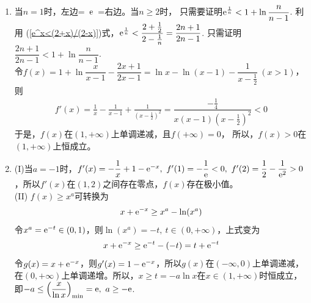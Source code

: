 \begin{enumerate}[label={\textbf{\arabic*.}},leftmargin=
    \inteval{\myenumleftmargin}pt]
\item  当$ n=1 $时，左边=\ $ \mathrm{e} $\ =右边。当$ n\geq 2 $时，
只需要证明$ \mathrm{e}^{\frac{1}{n}}<1+\ln \dfrac{n}{n-1} $. 利用
(\ref{e^x<(2+x)/(2-x)})式，$ \mathrm{e}^{\frac{1}{n}}<\dfrac{2+
    \frac{1}{2}}{2-\frac{1}{n}}=\dfrac{2n+1}{2n-1} $.
只需证明$ \dfrac{2n+1}{2n-1}<1+\ln \dfrac{n}{n-1} $. \\
令$ f(x)=1+\ln \dfrac{x}{x-1}-\dfrac{2x+1}{2x-1}=
\ln x-\ln(x-1)-\dfrac{1}{x-\frac{1}{2}}\ (x>1) $，则
\begin{align*}
    f'(x)=\frac{1}{x}-\frac{1}{x-1}+\frac{1}{(x-\frac{1}{2})^2}
    =\dfrac{-\frac{1}{4}}{x(x-1)(x-\frac{1}{2})^2}<0
\end{align*}
于是，$ f(x) $在$ (1,+\infty) $上单调递减，且$ f(+\infty)=0 $，
所以，$ f(x)>0 $在$ (1,+\infty) $上恒成立。

\item (I)当$ a=-1 $时，$ f'(x)=-\dfrac{1}{x}+1-\e^{-x},\ f'(1)=-\dfrac{1}{\e}<0,\ f'(2)=\dfrac{1}{2}-\dfrac{1}{\e^2}>0 $，所以$ f'(x) $在$ (1,2) $之间存在零点，$ f(x) $存在极小值。\\
(II) $ f(x)\geq x^a $可转换为
\begin{gather*}
    x+\mathrm{e}^{-x} \geq x^a -\ln (x^a) 	
\end{gather*}
令$ x^a=\mathrm{e}^{-t}\in (0,1) $，则$ \ln (x^a) =-t,\ t\in(0,+\infty) $，上式变为
\begin{gather*}
    x+\mathrm{e}^{-x} \geq \mathrm{e}^{-t}-(-t)=t+\mathrm{e}^{-t} 
\end{gather*}
令$ g(x)=x+\mathrm{e}^{-x} $，则$ g'(x)=1-\mathrm{e}^{-x} $，所以$ g(x) $在$ (-\infty,0) $上单调递减，在$ (0,+\infty) $上单调递增。所以，$ x\geq t =-a\ln x $在$ x\in(1,+\infty) $时恒成立，即$ -a\leq \left(\dfrac{x}{\ln x}\right)_{\min}=\e,\ a\geq -\e $. 


\end{enumerate}
